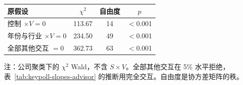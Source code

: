 \begin{center}
\begin{threeparttable}
\caption{其他交互项的联合检验}
\label{tab:keypoll-wald}
\begin{tabular}{lccc}
\toprule
原假设 & $\chi^2$ & 自由度 & \(p\) \\
\midrule
控制 $\times V=0$ & 113.67 & 14 & $<$0.001 \\
年份与行业 $\times V=0$ & 234.50 & 49 & $<$0.001 \\
全部其他交互 $=0$ & 362.73 & 63 & $<$0.001 \\
\bottomrule
\end{tabular}
\begin{tablenotes}\footnotesize
\item 注：公司聚类下的 $\chi^2$ Wald，不含 \(S\times V\)。全部其他交互在 5\% 水平拒绝，表~\ref{tab:keypoll-slopes-advisor} 的推断用完全交互。自由度是协方差矩阵的秩。
\end{tablenotes}
\end{threeparttable}
\end{center}

